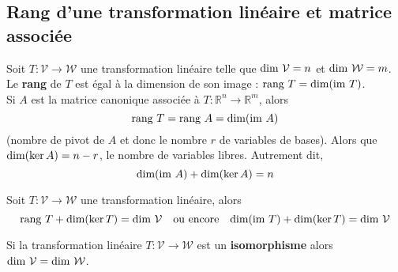 	\subsection{Rang d'une transformation linéaire et matrice associée}
		\begin{mydef}
			Soit $T:\mathcal{V}\longrightarrow\mathcal{W}$ une transformation linéaire telle que $\text{\normalfont{dim}}\ \mathcal{V}=n$ et $\text{\normalfont{dim}}\ \mathcal{W}=m$. Le \textbf{rang} de $T$ est égal à la dimension de son image : $\text{\normalfont{rang}}\ T=\text{\normalfont{dim}}(\text{\normalfont{im}}\ T)$.\\
			Si $A$ est la matrice canonique associée à $T:\mathbb{R}^n \longrightarrow\mathbb{R}^m$, alors $$\text{\normalfont{rang}}\ T=\text{\normalfont{rang}}\ A = \text{\normalfont{dim}}(\text{\normalfont{im}}\ A)$$ (nombre de pivot de $A$ et donc le nombre $r$ de variables de bases). Alors que $\text{\normalfont{dim}}(\ker A)=n-r$, le nombre de variables libres. Autrement dit, $$\text{\normalfont{dim}}(\text{\normalfont{im}}\ A) + \text{\normalfont{dim}}(\ker A)=n$$
		\end{mydef}
		\begin{mythm}
			Soit $T : \mathcal{V}\longrightarrow\mathcal{W}$ une transformation linéaire, alors
			\[\text{\normalfont{rang}}\ T+\text{\normalfont{dim}}(\ker T)=\text{\normalfont{dim}}\ \mathcal{V}\quad\text{ou encore}\quad\text{\normalfont{dim}}(\text{\normalfont{im}}\ T)+\text{\normalfont{dim}}(\ker T)=\text{\normalfont{dim}}\ \mathcal{V}\]
		\end{mythm}
		\begin{myprop}
			Si la transformation linéaire $T : \mathcal{V}\longrightarrow\mathcal{W}$ est un \textbf{isomorphisme} alors $\text{\normalfont{dim}}\ \mathcal{V}=\text{\normalfont{dim}}\ \mathcal{W}$.
		\end{myprop}

